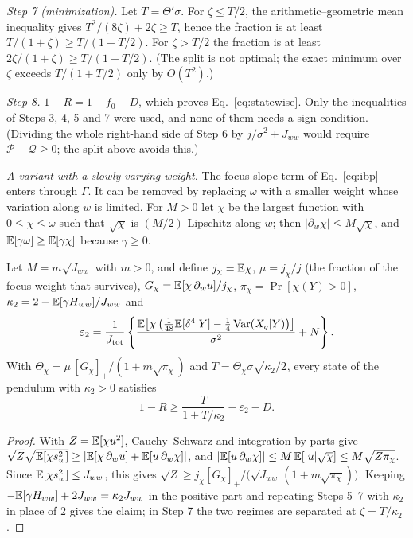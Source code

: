 \emph{Step 7 (minimization).} Let $T = \Theta'\sigma$. For $\zeta \leq T/2$, the arithmetic--geometric mean inequality gives $T^2/(8\zeta) + 2\zeta \geq T$, hence the fraction is at least $T/(1+\zeta) \geq T/(1 + T/2)$. For $\zeta > T/2$ the fraction is at least $2\zeta/(1+\zeta) \geq T/(1 + T/2)$. (The split is not optimal; the exact minimum over $\zeta$ exceeds $T/(1+T/2)$ only by $O(T^2)$.)

\emph{Step 8.} $1 - R = 1 - f_0 - D$, which proves Eq.~\eqref{eq:statewise}. Only the inequalities of Steps 3, 4, 5 and 7 were used, and none of them needs a sign condition. (Dividing the whole right-hand side of Step 6 by $j/\sigma^2 + J_{ww}$ would require $\mathcal P - \mathcal Q \geq 0$; the split above avoids this.)

\emph{A variant with a slowly varying weight.} The focus-slope term of Eq.~\eqref{eq:ibp} enters through $\Gamma$. It can be removed by replacing $\omega$ with a smaller weight whose variation along $w$ is limited. For $M > 0$ let $\chi$ be the largest function with $0 \leq \chi \leq \omega$ such that $\sqrt\chi$ is $(M/2)$-Lipschitz along $w$; then $|\partial_w\chi| \leq M\sqrt\chi$, and $\mathbb{E}[\gamma\omega] \geq \mathbb{E}[\gamma\chi]$ because $\gamma \geq 0$.

\begin{proposition}
\label{prop:smooth}
Let $M = m\sqrt{J_{ww}}$ with $m > 0$, and define $j_\chi = \mathbb{E}\chi$, $\mu = j_\chi/j$ (the fraction of the focus weight that survives), $G_\chi = \mathbb{E}[\chi\,\partial_w u]/j_\chi$, $\pi_\chi = \Pr[\chi(Y) > 0]$, $\kappa_2 = 2 - \mathbb{E}[\gamma H_{ww}]/J_{ww}$ and
\begin{equation*}
\varepsilon_2 = \frac{1}{J_{\rm tot}}\left\{\frac{\mathbb{E}\!\left[\chi\left(\tfrac1{48}\mathbb{E}[\delta^4|Y] - \tfrac14\operatorname{Var}(X_q|Y)\right)\right]}{\sigma^2} + N\right\}.
\end{equation*}
With $\Theta_\chi = \mu\,[G_\chi]_+/(1 + m\sqrt{\pi_\chi})$ and $T = \Theta_\chi\sigma\sqrt{\kappa_2/2}$, every state of the pendulum with $\kappa_2 > 0$ satisfies
\begin{equation}
1 - R \geq \frac{T}{1 + T/\kappa_2} - \varepsilon_2 - D .
\end{equation}
\end{proposition}

\begin{proof}
With $Z = \mathbb{E}[\chi u^2]$, Cauchy--Schwarz and integration by parts give $\sqrt Z\sqrt{\mathbb{E}[\chi s_w^2]} \geq |\mathbb{E}[\chi\,\partial_w u] + \mathbb{E}[u\,\partial_w\chi]|$, and $|\mathbb{E}[u\,\partial_w\chi]| \leq M\,\mathbb{E}[|u|\sqrt\chi] \leq M\sqrt{Z\pi_\chi}$. Since $\mathbb{E}[\chi s_w^2] \leq J_{ww}$, this gives $\sqrt Z \geq j_\chi[G_\chi]_+/\bigl(\sqrt{J_{ww}}\,(1 + m\sqrt{\pi_\chi})\bigr)$. Keeping $-\mathbb{E}[\gamma H_{ww}] + 2J_{ww} = \kappa_2J_{ww}$ in the positive part and repeating Steps 5--7 with $\kappa_2$ in place of $2$ gives the claim; in Step 7 the two regimes are separated at $\zeta = T/\kappa_2$.
\end{proof}

